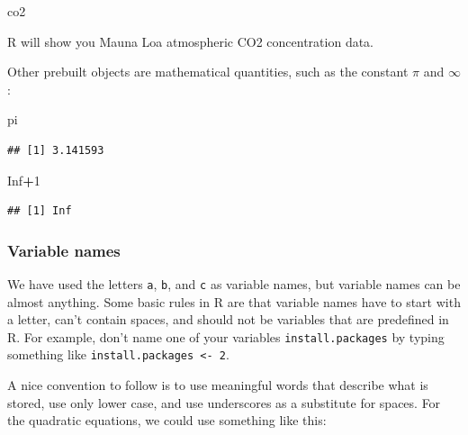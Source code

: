 \documentclass[
]{article}
\newenvironment{Shaded}{\begin{snugshade}}{\end{snugshade}}
\newcommand{\ConstantTok}[1]{\textcolor[rgb]{0.56,0.35,0.01}{#1}}
\newcommand{\DecValTok}[1]{\textcolor[rgb]{0.00,0.00,0.81}{#1}}
\newcommand{\NormalTok}[1]{#1}
\newcommand{\SpecialCharTok}[1]{\textcolor[rgb]{0.81,0.36,0.00}{\textbf{#1}}}
\begin{document}
\begin{Shaded}
\begin{Highlighting}[]
\NormalTok{co2}
\end{Highlighting}
\end{Shaded}

R will show you Mauna Loa atmospheric CO2 concentration data.

Other prebuilt objects are mathematical quantities, such as the constant
\(\pi\) and \(\infty\):

\begin{Shaded}
\begin{Highlighting}[]
\NormalTok{pi}
\end{Highlighting}
\end{Shaded}

\begin{verbatim}
## [1] 3.141593
\end{verbatim}

\begin{Shaded}
\begin{Highlighting}[]
\ConstantTok{Inf}\SpecialCharTok{+}\DecValTok{1}
\end{Highlighting}
\end{Shaded}

\begin{verbatim}
## [1] Inf
\end{verbatim}

\subsubsection{Variable names}\label{variable-names}

We have used the letters \texttt{a}, \texttt{b}, and \texttt{c} as
variable names, but variable names can be almost anything. Some basic
rules in R are that variable names have to start with a letter, can't
contain spaces, and should not be variables that are predefined in R.
For example, don't name one of your variables \texttt{install.packages}
by typing something like \texttt{install.packages\ \textless{}-\ 2}.

A nice convention to follow is to use meaningful words that describe
what is stored, use only lower case, and use underscores as a substitute
for spaces. For the quadratic equations, we could use something like
this:
\end{document}
